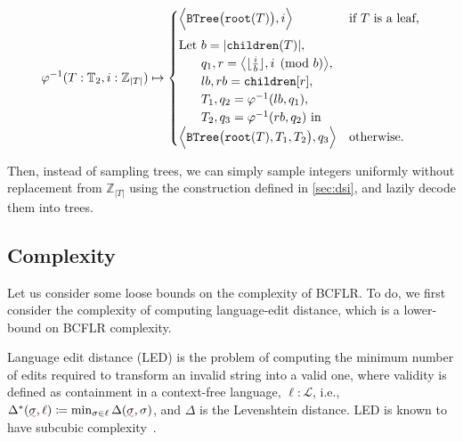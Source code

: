 \documentclass[sigplan,review,anonymous,acmsmall]{acmart}\settopmatter{printfolios=false,printccs=false,printacmref=false}
\begin{document}
  \begin{equation}
    \varphi^{-1}(T: \mathbb{T}_2, i: \mathbb{Z}_{|T|}) \mapsto \begin{cases}
                                                                 \Big\langle\texttt{BTree}\big(\texttt{root}(T)\big), i\Big\rangle & \text{if $T$ is a leaf,} \vspace{5pt}\\
                                                                 \text{Let } b = |\texttt{children}(T)|,\\
                                                                 \phantom{\text{Let }} q_1, r=\big\langle\lfloor\frac{i}{b}\rfloor, i \pmod{b}\big\rangle,\\
                                                                 \phantom{\text{Let }} lb, rb = \texttt{children}[r],\\
                                                                 \phantom{\text{Let }} T_1, q_2 = \varphi^{-1}(lb, q_1),\\
                                                                 \phantom{\text{Let }} T_2, q_3 = \varphi^{-1}(rb, q_2) \text{ in } \\
                                                                 \Big\langle\texttt{BTree}\big(\texttt{root}(T), T_1, T_2\big), q_3\Big\rangle & \text{otherwise.} \\
    \end{cases}
  \end{equation}

  Then, instead of sampling trees, we can simply sample integers uniformly without replacement from $\mathbb{Z}_{|T|}$ using the construction defined in \ref{sec:dsi}, and lazily decode them into trees.

  \subsection{Complexity}

  Let us consider some loose bounds on the complexity of BCFLR. To do, we first consider the complexity of computing language-edit distance, which is a lower-bound on BCFLR complexity.

  \begin{definition}
    Language edit distance (LED) is the problem of computing the minimum number of edits required to transform an invalid string into a valid one, where validity is defined as containment in a context-free language, $\ell: \mathcal{L}$, i.e., $\Delta^*(\err{\sigma}, \ell) \coloneqq \min_{\sigma \in \ell}\Delta(\err{\sigma}, \sigma)$, and $\Delta$ is the Levenshtein distance. LED is known to have subcubic complexity~\cite{bringmann2019truly}.
  \end{definition}
\end{document}
